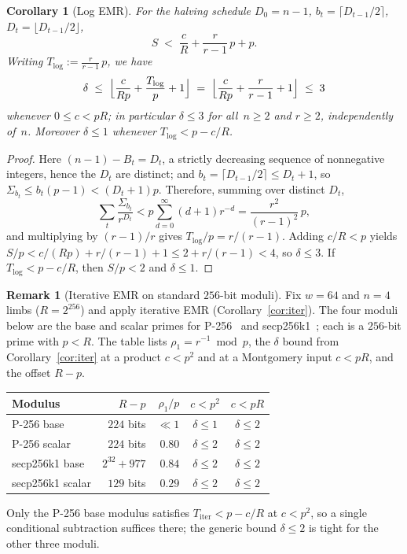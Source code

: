 \documentclass[reqno]{amsart}
\newtheorem{corollary}[theorem]{Corollary}
\theoremstyle{definition}
\newtheorem{remark}[theorem]{Remark}
\begin{document}
\begin{corollary}[Log EMR]\label{cor:log}
For the halving schedule $D_0=n-1$, $b_t=\lceil D_{t-1}/2\rceil$, $D_t=\lfloor D_{t-1}/2\rfloor$,
\[
  S \;<\; \frac{c}{R}+\frac{r}{r-1}\,p+p.
\]
Writing $T_{\mathrm{log}}:=\frac{r}{r-1}\,p$, we have
\[
  \delta \;\le\; \Bigl\lfloor \frac{c}{Rp}+\frac{T_{\mathrm{log}}}{p}+1 \Bigr\rfloor
  \;=\; \Bigl\lfloor \frac{c}{Rp}+\frac{r}{r-1}+1 \Bigr\rfloor
  \;\le\; 3
\]
whenever $0\le c<pR$; in particular $\delta\le 3$ for all~$n\ge 2$ and $r\ge 2$, independently of~$n$.
Moreover $\delta\le 1$ whenever $T_{\mathrm{log}}<p-c/R$.
\end{corollary}
\begin{proof}
Here $(n-1)-B_t=D_t$, a strictly decreasing sequence of nonnegative integers, hence the $D_t$ are distinct; and $b_t=\lceil D_{t-1}/2\rceil\le D_t+1$, so $\Sigma_{b_t}\le b_t(p-1)<(D_t+1)p$.
Therefore, summing over distinct $D_t$,
\[
  \sum_{t}\frac{\Sigma_{b_t}}{r^{D_t}} < p\sum_{d=0}^{\infty}(d+1)r^{-d} = \frac{r^2}{(r-1)^2}\,p,
\]
and multiplying by $(r-1)/r$ gives $T_{\mathrm{log}}/p=r/(r-1)$.
Adding $c/R<p$ yields $S/p<c/(Rp)+r/(r-1)+1\le 2+r/(r-1)<4$, so $\delta\le 3$.
If $T_{\mathrm{log}}<p-c/R$, then $S/p<2$ and $\delta\le 1$.
\end{proof}

\begin{remark}[Iterative EMR on standard $256$-bit moduli]\label{rem:ecdsa-delta}
Fix $w=64$ and $n=4$ limbs ($R=2^{256}$) and apply iterative EMR (Corollary~\ref{cor:iter}).
The four moduli below are the base and scalar primes for P-256~\cite{nistfips186} and secp256k1~\cite{sec2}; each is a $256$-bit prime with $p<R$.
The table lists $\rho_1=r^{-1}\bmod p$, the $\delta$ bound from Corollary~\ref{cor:iter} at a product $c<p^2$ and at a Montgomery input $c<pR$, and the offset $R-p$.
\begin{center}
\renewcommand{\arraystretch}{1.15}
\begin{tabular}{@{}lrrcc@{}}
\hline
Modulus & $R-p$ & $\rho_1/p$ & $c<p^2$ & $c<pR$ \\
\hline
P-256 base & $224$ bits & $\ll 1$ & $\delta\le 1$ & $\delta\le 2$ \\
P-256 scalar & $224$ bits & $0.80$ & $\delta\le 2$ & $\delta\le 2$ \\
secp256k1 base & $2^{32}+977$ & $0.84$ & $\delta\le 2$ & $\delta\le 2$ \\
secp256k1 scalar & $129$ bits & $0.29$ & $\delta\le 2$ & $\delta\le 2$ \\
\hline
\end{tabular}
\end{center}
\noindent
Only the P-256 base modulus satisfies $T_{\mathrm{iter}}<p-c/R$ at $c<p^2$, so a single conditional subtraction suffices there; the generic bound $\delta\le 2$ is tight for the other three moduli.
\end{remark}
\end{document}
